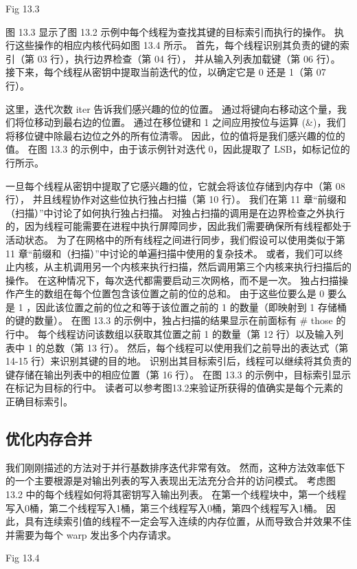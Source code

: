 {\color{red} Fig 13.3}

图 13.3 显示了图 13.2 示例中每个线程为查找其键的目标索引而执行的操作。 
执行这些操作的相应内核代码如图 13.4 所示。 首先，每个线程识别其负责的键的索引（第 03 行），执行边界检查（第 04 行），
并从输入列表加载键（第 06 行）。 接下来，每个线程从密钥中提取当前迭代的位，以确定它是 0 还是 1（第 07 行）。

这里，迭代次数 iter 告诉我们感兴趣的位的位置。 通过将键向右移动这个量，我们将位移动到最右边的位置。 
通过在移位键和 1 之间应用按位与运算 (\&)，我们将移位键中除最右边位之外的所有位清零。 
因此，位的值将是我们感兴趣的位的值。 在图 13.3 的示例中，由于该示例针对迭代 0，因此提取了 LSB，如标记位的行所示。

一旦每个线程从密钥中提取了它感兴趣的位，它就会将该位存储到内存中（第 08 行），
并且线程协作对这些位执行独占扫描（第 10 行）。 我们在第 11 章“前缀和（扫描）”中讨论了如何执行独占扫描。 
对独占扫描的调用是在边界检查之外执行的，因为线程可能需要在进程中执行屏障同步，因此我们需要确保所有线程都处于活动状态。 
为了在网格中的所有线程之间进行同步，我们假设可以使用类似于第 11 章“前缀和（扫描）”中讨论的单遍扫描中使用的复杂技术。 
或者，我们可以终止内核，从主机调用另一个内核来执行扫描，然后调用第三个内核来执行扫描后的操作。 
在这种情况下，每次迭代都需要启动三次网格，而不是一次。 独占扫描操作产生的数组在每个位置包含该位置之前的位的总和。 
由于这些位要么是 0 要么是 1 ，因此该位置之前的位之和等于该位置之前的 1 的数量（即映射到 1 存储桶的键的数量）。 
在图 13.3 的示例中，独占扫描的结果显示在前面标有 \# those 的行中。 
每个线程访问该数组以获取其位置之前 1 的数量（第 12 行）以及输入列表中 1 的总数（第 13 行）。 
然后，每个线程可以使用我们之前导出的表达式（第 14-15 行）来识别其键的目的地。 
识别出其目标索引后，线程可以继续将其负责的键存储在输出列表中的相应位置（第 16 行）。 
在图 13.3 的示例中，目标索引显示在标记为目标的行中。 读者可以参考图13.2来验证所获得的值确实是每个元素的正确目标索引。

\subsection{优化内存合并}
我们刚刚描述的方法对于并行基数排序迭代非常有效。 
然而，这种方法效率低下的一个主要根源是对输出列表的写入表现出无法充分合并的访问模式。 
考虑图 13.2 中的每个线程如何将其密钥写入输出列表。 
在第一个线程块中，第一个线程写入0桶，第二个线程写入1桶，第三个线程写入0桶，第四个线程写入1桶。 
因此，具有连续索引值的线程不一定会写入连续的内存位置，从而导致合并效果不佳并需要为每个 warp 发出多个内存请求。

{\color{red} Fig 13.4}

